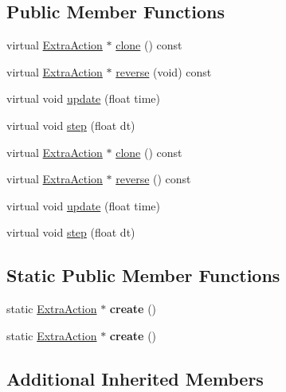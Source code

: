 \subsection*{Public Member Functions}
\begin{DoxyCompactItemize}
\item 
virtual \hyperlink{classExtraAction}{Extra\+Action} $\ast$ \hyperlink{classExtraAction_a758a349952071ad00b74ddf34cfa9b2a}{clone} () const
\item 
virtual \hyperlink{classExtraAction}{Extra\+Action} $\ast$ \hyperlink{classExtraAction_ac249af1bbc5f965c52e04a254ef84246}{reverse} (void) const
\item 
virtual void \hyperlink{classExtraAction_a65059820b110dbea5b63cd7ac6278434}{update} (float time)
\item 
virtual void \hyperlink{classExtraAction_a7e15c6b27f49d1057bf81bd0527f041b}{step} (float dt)
\item 
virtual \hyperlink{classExtraAction}{Extra\+Action} $\ast$ \hyperlink{classExtraAction_ab934c199930dec4d3bff42d61ce940da}{clone} () const
\item 
virtual \hyperlink{classExtraAction}{Extra\+Action} $\ast$ \hyperlink{classExtraAction_afc325a6f88855b68c6f29eeed4505316}{reverse} () const
\item 
virtual void \hyperlink{classExtraAction_aea5391e5d22b807142a0f0226a8db170}{update} (float time)
\item 
virtual void \hyperlink{classExtraAction_adf523dd380d7c8e093c58473e2c84304}{step} (float dt)
\end{DoxyCompactItemize}
\subsection*{Static Public Member Functions}
\begin{DoxyCompactItemize}
\item 
\mbox{\label{classExtraAction_a52202d36781fab41506cc46434139cde}} 
static \hyperlink{classExtraAction}{Extra\+Action} $\ast$ {\bfseries create} ()
\item 
\mbox{\label{classExtraAction_a235fc2182a59ddc91c36eb59af9a3108}} 
static \hyperlink{classExtraAction}{Extra\+Action} $\ast$ {\bfseries create} ()
\end{DoxyCompactItemize}
\subsection*{Additional Inherited Members}


